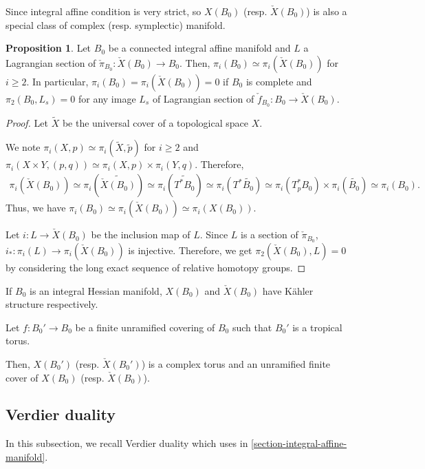 \documentclass[a4paper,dvipdfmx,reqno,12pt]{amsart}
\theoremstyle{definition}
\newtheorem{proposition}[theorem]{Proposition}
\numberwithin{equation}{section}
\begin{document}
Since integral affine condition is very strict, so 
$X(B_0)$ (resp. $\check{X}(B_0)$) is also a special class of complex (resp. symplectic) manifold.

\begin{proposition}

\label{proposition-unobstructed-lagrangian}
Let $B_0$ be a connected integral affine manifold 
and $L$ a Lagrangian section of 
$\check{\pi}_{B_0}\colon \check{X}(B_0)\to B_0$. 
Then, $\pi_i(B_0)\simeq \pi_i(\check{X}(B_0))$ 
for $i\geq 2$.
In particular, 
$\pi_i(B_0)=\pi_i(\check{X}(B_0))=0$ if 
$B_0$ is complete and $\pi_2(B_0,L_s)=0$ for any image
$L_s$ of 
Lagrangian section of $\check{f}_{B_0}\colon B_0 \to \check{X}(B_0)$.
\end{proposition}
\begin{proof}
Let $\widetilde{X}$ be the universal cover of 
a topological space $X$.


We note $\pi_{i}(X,p)\simeq 
\pi_{i}(\widetilde{X},\tilde{p})$ for $i\geq 2$ and 
$\pi_{i}(X\times Y,(p,q))\simeq \pi_i(X,p)
\times \pi_i(Y,q)$. Therefore,
\begin{align}
\pi_{i}(\check{X}(B_0))\simeq 
\pi_{i}(\widetilde{\check{X}(B_0)})\simeq 
\pi_{i}(\widetilde{T^{*}B_0})\simeq 
\pi_{i}(T^{*}\widetilde{B_0})\simeq 
\pi_{i}(T_p^* B_0)\times \pi_{i}(\widetilde{B_0})\simeq 
\pi_{i}(B_0).
\end{align}
Thus, we have 
$\pi_{i}(B_0)\simeq \pi_{i}(\check{X}(B_0))\simeq 
\pi_{i}(X(B_0))$. 

Let $i\colon L\to \check{X}(B_0)$ be the inclusion map of 
$L$.
Since $L$ is a section of 
$\check{\pi}_{B_0}$, 
$i_*\colon \pi_i(L)\to \pi_i(\check{X}(B_0))$ is 
injective. Therefore, we get 
$\pi_2(\check{X}(B_0),L)=0$ by considering the long exact
sequence of relative homotopy groups.
\end{proof}



If $B_0$ is an integral Hessian manifold, 
$X(B_0)$ and $\check{X}(B_0)$ have K\"ahler structure 
respectively.

Let $f:B_0' \to B_0$ be a finite unramified covering of $B_0$ such that $B_0'$ is a tropical torus.

Then, $X(B_0')$ (resp. $\check{X}(B_0')$) 
is a complex torus and an unramified finite cover 
of $X(B_0)$ (resp. $\check{X}(B_0)$).

\subsection{Verdier duality} \label{section-verdier-dual}
In this subsection, we recall Verdier duality which 
uses in \cref{section-integral-affine-manifold}.
\end{document}

